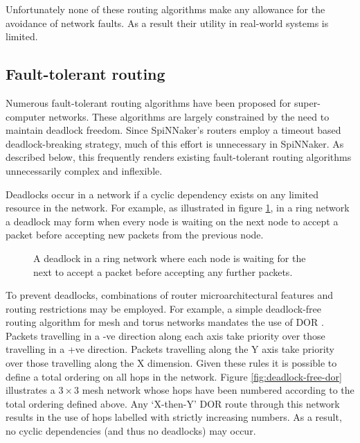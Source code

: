 			Unfortunately none of these routing algorithms make any allowance for the
			avoidance of network faults. As a result their utility in real-world
			systems is limited.
		
		\subsection{Fault-tolerant routing}
			
			Numerous fault-tolerant routing algorithms have been proposed for
			super-computer networks. These algorithms are largely constrained by the
			need to maintain deadlock freedom. Since SpiNNaker's routers employ a
			timeout based deadlock-breaking strategy, much of this effort is
			unnecessary in SpiNNaker. As described below, this frequently renders
			existing fault-tolerant routing algorithms unnecessarily complex and
			inflexible.
			
			Deadlocks occur in a network if a cyclic dependency exists on any limited
			resource in the network. For example, as illustrated in figure
			\ref{fig:ring-deadlock}, in a ring network a deadlock may form when every
			node is waiting on the next node to accept a packet before accepting new
			packets from the previous node.
			
			\begin{figure}
				\center
				
				\caption{A deadlock in a ring network where each node is waiting for
				the next to accept a packet before accepting any further packets.}
				\label{fig:ring-deadlock}
			\end{figure}
			
			To prevent deadlocks, combinations of router microarchitectural features
			and routing restrictions may be employed. For example, a simple
			deadlock-free routing algorithm for mesh and torus networks mandates the
			use of DOR \cite{dally93}. Packets travelling in a -ve direction along
			each axis take priority over those travelling in a +ve direction. Packets
			travelling along the Y axis take priority over those travelling along the
			X dimension. Given these rules it is possible to define a total ordering
			on all hops in the network. Figure \ref{fig:deadlock-free-dor}
			illustrates a $3\times3$ mesh network whose hops have been numbered
			according to the total ordering defined above.  Any `X-then-Y' DOR route
			through this network results in the use of hops labelled with strictly
			increasing numbers. As a result, no cyclic dependencies (and thus no
			deadlocks) may occur.
			
